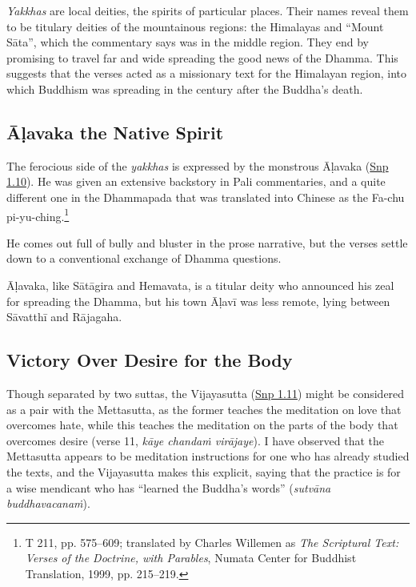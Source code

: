 \documentclass[12pt,openany]{book}%
\begin{document}
\textit{Yakkhas} are local deities, the spirits of particular places. Their names reveal them to be titulary deities of the mountainous regions: the Himalayas and “Mount \textsanskrit{Sāta}”, which the commentary says was in the middle region. They end by promising to travel far and wide spreading the good news of the Dhamma. This suggests that the verses acted as a missionary text for the Himalayan region, into which Buddhism was spreading in the century after the Buddha’s death.

\subsection*{\textsanskrit{Āḷavaka} the Native Spirit}

The ferocious side of the \textit{yakkhas} is expressed by the monstrous \textsanskrit{Āḷavaka} (\href{https://suttacentral.net/snp1.10/en/sujato}{Snp 1.10}). He was given an extensive backstory in Pali commentaries, and a quite different one in the Dhammapada that was translated into Chinese as the Fa-chu pi-yu-ching.\footnote{T 211, pp. 575–609; translated by Charles Willemen as \textit{The Scriptural Text: Verses of the Doctrine, with Parables}, Numata Center for Buddhist Translation, 1999, pp. 215–219. }

He comes out full of bully and bluster in the prose narrative, but the verses settle down to a conventional exchange of Dhamma questions.

\textsanskrit{Āḷavaka}, like \textsanskrit{Sātāgira} and Hemavata, is a titular deity who announced his zeal for spreading the Dhamma, but his town \textsanskrit{Āḷavī} was less remote, lying between \textsanskrit{Sāvatthī} and \textsanskrit{Rājagaha}.

\subsection*{Victory Over Desire for the Body}

Though separated by two suttas, the Vijayasutta (\href{https://suttacentral.net/snp1.11/en/sujato}{Snp 1.11}) might be considered as a pair with the Mettasutta, as the former teaches the meditation on love that overcomes hate, while this teaches the meditation on the parts of the body that overcomes desire (verse 11, \textit{\textsanskrit{kāye} \textsanskrit{chandaṁ} \textsanskrit{virājaye}}). I have observed that the Mettasutta appears to be meditation instructions for one who has already studied the texts, and the Vijayasutta makes this explicit, saying that the practice is for a wise mendicant who has “learned the Buddha’s words” (\textit{\textsanskrit{sutvāna} \textsanskrit{buddhavacanaṁ}}).
\end{document}
